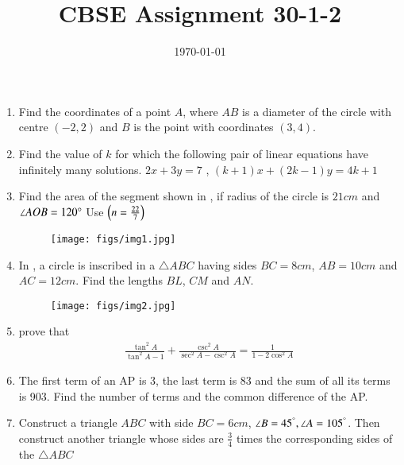 \documentclass[12pt,-letter paper]{article}
\title{ CBSE Assignment 30-1-2}
\date{\today}
\begin{document}
\maketitle{}
\begin{enumerate}
     

\item Find the coordinates of a point $A$, where $AB$ is a diameter of the circle with centre $(-2, 2)$ and $B$ is the point with coordinates $(3, 4)$.
\item Find the value of $k$ for which the following pair of linear equations have infinitely many solutions. $2x+3y=7$ , $(k+1)x+(2k-1)y=4k+1$
\item Find the area of the segment shown in , if radius of the circle is $21 cm$ and $\angle AOB = 120\degree$ Use $\left(n =\frac{22}{7}\right) $
\begin{figure}[H]                                     
\centering
	
 \texttt{[image: figs/img1.jpg]}
		
\caption{}
		
\label{fig:figure1}
\end{figure}
\item In , a circle is inscribed in a $\triangle ABC$ having sides $BC=8 cm$, $AB = 10cm$ and $AC = 12 cm$. Find the lengths $BL$, $CM$ and $AN$.
                                         
\begin{figure}[H]                                     
\centering
\texttt{[image: figs/img2.jpg]}
\caption{}
\label{fig:figure2}

 \end{figure}
\item prove that \begin{align} \frac{\tan^2A}{\tan^2 A-1}+\frac{\csc^2 A}{\sec^2 A-\csc^2 A}=\frac{1}{1-2\cos^2 A}\end{align}
\item The first term of an AP is 3, the last term is 83 and the sum of all its terms is 903. Find the number of terms and the common difference of the AP.
\item Construct a triangle $ABC$ with side $BC = 6 cm$, $\angle B=45^\degree, \angle A= 105^\degree$. Then construct another triangle whose sides are $\frac{3}{4}$ times the corresponding sides of the $\triangle ABC$





\end{enumerate}
\end{document}
